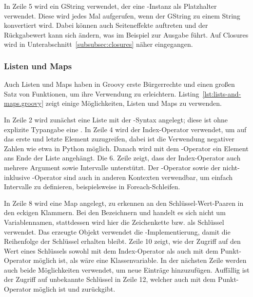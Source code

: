 In Zeile 5 wird ein GString verwendet, der eine -Instanz als Platzhalter verwendet.
Diese wird jedes Mal aufgerufen, wenn der GString zu einem String konvertiert wird.
Dabei können auch Seiteneffekte auftreten und der Rückgabewert kann sich ändern, was im Beispiel zur Ausgabe  führt.
Auf Closures wird in Unterabschnitt~\ref{subsubsec:closures} näher eingegangen.

\subsubsection{Listen und Maps}\label{subsubsec:listen-und-maps}

Auch Listen und Maps haben in Groovy erste Bürgerrechte und einen großen Satz von Funktionen, um ihre Verwendung zu erleichtern.
Listing~\ref{lst:lists-and-maps.groovy} zeigt einige Möglichkeiten, Listen und Maps zu verwenden.


In Zeile 2 wird zunächst eine Liste mit der \code{[]}-Syntax angelegt;
diese ist ohne explizite Typangabe eine .
In Zeile 4 wird der Index-Operator verwendet, um auf das erste und letzte Element zuzugreifen, dabei ist die Verwendung negativer Zahlen wie etwa in Python möglich.
Danach wird mit dem \code{<<}-Operator ein Element ans Ende der Liste angehängt.
Die 6. Zeile zeigt, dass der Index-Operator auch mehrere Argument sowie Intervalle unterstützt.
Der -Operator sowie der nicht-inklusive -Operator sind auch in anderen Kontexten verwendbar, um einfach Intervalle zu definieren, beispielsweise in Foreach-Schleifen.

In Zeile 8 wird eine Map angelegt, zu erkennen an den Schlüssel-Wert-Paaren in den eckigen Klammern.
Bei den Bezeichnern  und  handelt es sich nicht um Variablennamen, stattdessen wird hier die Zeichenkette  bzw.  als Schlüssel verwendet.
Das erzeugte Objekt verwendet die -Implementierung, damit die Reihenfolge der Schlüssel erhalten bleibt.
Zeile 10 zeigt, wie der Zugriff auf den Wert eines Schlüssels sowohl mit dem Index-Operator als auch mit dem Punkt-Operator möglich ist, als wäre  eine Klassenvariable.
In der nächsten Zeile werden auch beide Möglichkeiten verwendet, um neue Einträge hinzuzufügen.
Auffällig ist der Zugriff auf unbekannte Schlüssel in Zeile 12, welcher auch mit dem Punkt-Operator möglich ist und  zurückgibt.

